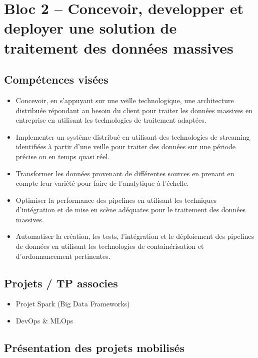\documentclass{article}
\begin{document}
\newpage
\section{Bloc 2 -- Concevoir, developper et deployer une solution de traitement des données massives}
\subsection{Compétences visées}

\begin{itemize}
    \item Concevoir, en s'appuyant sur une veille technologique, une architecture
          distribuée répondant au besoin du client pour traiter les données massives en
          entreprise en utilisant les technologies de traitement adaptées.
    \item Implementer un système distribué en utilisant des technologies de
          streaming identifiées à partir d'une veille pour traiter des données sur une
          période précise ou en temps quasi réel.
    \item Transformer les données provenant de différentes sources en prenant en
          compte leur variété pour faire de l'analytique à l'échelle.
    \item Optimiser la performance des pipelines en utilisant les techniques
          d'intégration et de mise en scène adéquates pour le traitement des données
          massives.
    \item Automatiser la création, les tests, l'intégration et le déploiement des
          pipelines de données en utilisant les technologies de containérisation et
          d'ordonnancement pertinentes.
\end{itemize}

\subsection{Projets / TP associes}

\begin{itemize}
    \item Projet Spark (Big Data Frameworks)
    \item DevOps \& MLOps
\end{itemize}

\subsection{Présentation des projets mobilisés}
\end{document}
